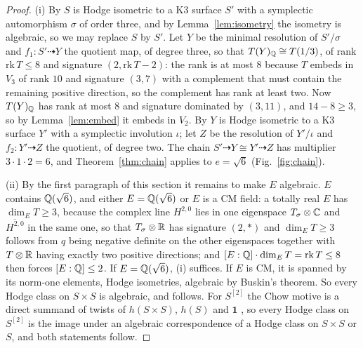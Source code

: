 \begin{proof}
(i) By \cite[Prop.~2.11]{Var23} $S$ is Hodge isometric to a K3 surface $S'$ with a symplectic automorphism $\sigma$ of order three, and by Lemma~\ref{lem:isometry} the isometry is algebraic, so we may replace $S$ by $S'$. Let $Y$ be the minimal resolution of $S'/\sigma$ and $f_{1}\colon S'\dashrightarrow Y$ the quotient map, of degree three, so that $T(Y)_{\mathbb{Q}}\cong T(1/3)$, of rank $\mathrm{rk}\,T\le8$ and signature $(2,\mathrm{rk}\,T-2)$: the rank is at most $8$ because $T$ embeds in $V_{3}$ of rank $10$ and signature $(3,7)$ with a complement that must contain the remaining positive direction, so the complement has rank at least two. Now $T(Y)_{\mathbb{Q}}$ has rank at most $8$ and signature dominated by $(3,11)$, and $14-8\ge3$, so by Lemma~\ref{lem:embed} it embeds in $V_{2}$. By \cite[Prop.~2.5]{Var23} $Y$ is Hodge isometric to a K3 surface $Y'$ with a symplectic involution $\iota$; let $Z$ be the resolution of $Y'/\iota$ and $f_{2}\colon Y'\dashrightarrow Z$ the quotient, of degree two. The chain $S'\dashrightarrow Y\cong Y'\dashrightarrow Z$ has multiplier $3\cdot1\cdot2=6$, and Theorem~\ref{thm:chain} applies to $e=\sqrt6$ (Fig.~\ref{fig:chain}).

(ii) By the first paragraph of this section it remains to make $E$ algebraic. $E$ contains $\mathbb{Q}(\sqrt6)$, and either $E=\mathbb{Q}(\sqrt6)$ or $E$ is a CM field: a totally real $E$ has $\dim_{E}T\ge3$, because the complex line $H^{2,0}$ lies in one eigenspace $T_{\sigma}\otimes\mathbb{C}$ and $\overline{H^{2,0}}$ in the same one, so that $T_{\sigma}\otimes\mathbb{R}$ has signature $(2,\ast)$ and $\dim_{E}T\ge3$ follows from $q$ being negative definite on the other eigenspaces together with $T\otimes\mathbb{R}$ having exactly two positive directions; and $[E:\mathbb{Q}]\cdot\dim_{E}T=\mathrm{rk}\,T\le8$ then forces $[E:\mathbb{Q}]\le2$. If $E=\mathbb{Q}(\sqrt6)$, (i) suffices. If $E$ is CM, it is spanned by its norm-one elements, Hodge isometries, algebraic by Buskin's theorem. So every Hodge class on $S\times S$ is algebraic, and \Fiii{} follows. For $S^{[2]}$ the Chow motive is a direct summand of twists of $h(S\times S)$, $h(S)$ and $\mathbf{1}$ \cite{dCM02}, so every Hodge class on $S^{[2]}$ is the image under an algebraic correspondence of a Hodge class on $S\times S$ or $S$, and both statements follow.


\end{proof}
